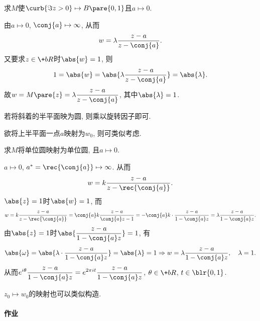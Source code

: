 \documentclass[../ComplexVariable.tex]{subfiles}
\begin{document}
\begin{sample}
    \begin{ex}
        求$M$使$\curb{\Im z>0}\mapsto B\pare{0,1}$且$a\mapsto 0$.
    \end{ex}
    \begin{solution}
        由$a\mapsto 0$, $\conj{a}\mapsto \infty$, 从而
        \[ w = \lambda \frac{z-a}{z-\conj{a}}. \]
        又要求$z\in\+bR$时$\abs{w} = 1$, 则
        \[ 1 = \abs{w} = \abs{\lambda \frac{z-a}{z-\conj{a}}} = \abs{\lambda}. \]
        故$\displaystyle w = M\pare{z} = \lambda \frac{z-a}{z-\conj{a}}$, 其中$\abs{\lambda} = 1$.
    \end{solution}
    \begin{remark}
        若将斜着的半平面映为圆, 则乘以旋转因子即可.
    \end{remark}
    \begin{remark}
        欲将上半平面一点$a$映射为$w_0$, 则可类似考虑.
    \end{remark}
\end{sample}
\begin{sample}
    \begin{ex}
        求$M$将单位圆映射为单位圆, 且$a\mapsto 0$.
    \end{ex}
    \begin{solution}
        $a\mapsto 0$, $a^* = \displaystyle \rec{\conj{a}} \mapsto \infty$. 从而
        \[ w = k \frac{z-a}{z-\rec{\conj{a}}}. \]
        $\abs{z}=1$时$\abs{w} = 1$, 而
        \[ w = k \frac{z-a}{z-\rec{\conj{a}}} = \conj{a} k \frac{z-a}{\conj{a}z - 1} = -\conj{a}k \cdot \frac{z-a}{1-\conj{a}z} = \lambda \frac{z-a}{1-\conj{a}z}. \]
        由$\abs{z}=1$时$\displaystyle \abs{\frac{z-a}{1-\conj{a}z}} = 1$, 有
        \[ \abs{\omega} = \abs{\lambda \cdot \frac{z-a}{1-\conj{a}z}} = \abs{\lambda} = 1 \Rightarrow w = \lambda \frac{z-a}{1-\conj{a}z},\quad \lambda = 1. \]
        从而$\displaystyle e^{i\theta}\frac{z-a}{1-\conj{a}z} = e^{2\pi it} \frac{z-a}{1-\conj{a}z}$, $\theta\in\+bR$, $t\in \blr{0,1}$.
    \end{solution}
    \begin{remark}
        $z_0\mapsto w_0$的映射也可以类似构造.
    \end{remark}
\end{sample}

\paragraph{作业} %
\label{par:作业}
\end{document}
